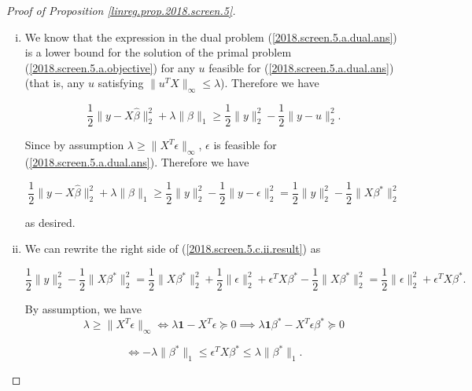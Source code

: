 \begin{proof}[Proof of Proposition \ref{linreg.prop.2018.screen.5}]
\begin{enumerate}[(a)]
\begin{enumerate}[(i)]
\item


We know that the expression in the dual problem (\ref{2018.screen.5.a.dual.ans}) is a lower bound for the solution of the primal problem (\ref{2018.screen.5.a.objective}) for any \(u\) feasible for (\ref{2018.screen.5.a.dual.ans}) (that is, any \(u\) satisfying \(\lVert u^TX \rVert_\infty \leq \lambda\)). Therefore we have

\[
\frac{1}{2} \lVert y - X \hat{\beta} \rVert_2^2 + \lambda \lVert \beta \rVert_1 \geq  \frac{1}{2} \lVert y \rVert_2^2 - \frac{1}{2} \lVert y - u \rVert_2^2.
\]

Since by assumption \(\lambda \geq \lVert X^T \epsilon \rVert_\infty\), \(\epsilon\) is feasible for (\ref{2018.screen.5.a.dual.ans}). Therefore we have

\begin{equation}\label{2018.screen.5.c.ii.result}
\frac{1}{2} \lVert y - X \hat{\beta} \rVert_2^2 + \lambda \lVert \beta \rVert_1 \geq  \frac{1}{2} \lVert y \rVert_2^2 - \frac{1}{2} \lVert y - \epsilon \rVert_2^2 =  \frac{1}{2} \lVert y \rVert_2^2 - \frac{1}{2} \lVert X \beta^* \rVert_2^2
\end{equation}

as desired.


\item 



We can rewrite the right side of (\ref{2018.screen.5.c.ii.result}) as 

\begin{equation}\label{2018.screen.5.c.ii.result.rewritten}
\frac{1}{2} \lVert y \rVert_2^2 - \frac{1}{2} \lVert X \beta^* \rVert_2^2 = \frac{1}{2} \lVert X \beta^* \rVert_2^2 + \frac{1}{2} \lVert \epsilon \rVert_2^2 + \epsilon^T X \beta^* - \frac{1}{2} \lVert X \beta^* \rVert_2^2  =  \frac{1}{2} \lVert \epsilon \rVert_2^2 + \epsilon^T X \beta^*. 
\end{equation}

By assumption, we have 
\[
\lambda \geq \lVert X^T \epsilon \rVert_\infty \iff \lambda \boldsymbol{1}  - X^T \epsilon \succeq 0 \implies \lambda \boldsymbol{1} \beta^*  - X^T \epsilon \beta^* \succeq 0 
\]

\[
\iff - \lambda \lVert \beta^* \rVert_1 \leq \epsilon^T X \beta^* \leq \lambda \lVert \beta^* \rVert_1.
\]


\end{enumerate}
\end{enumerate}
\end{proof}
